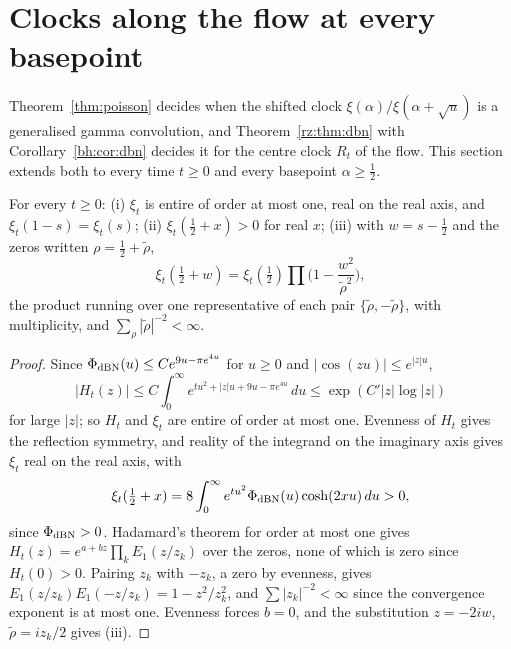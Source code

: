 \section{Clocks along the flow at every basepoint}\label{cp:sec:transfer}

Theorem~\ref{thm:poisson} decides when the shifted clock $\xi(\alpha)/\xi(\alpha+\sqrt u)$ is a generalised gamma convolution, and Theorem~\ref{rz:thm:dbn} with Corollary~\ref{bh:cor:dbn} decides it for the centre clock $R_t$ of the flow. This section extends both to every time $t\ge0$ and every basepoint $\alpha\ge\frac12$.

\begin{lemma}[Structure of $\xi_t$]\label{cp:lem:structure}
For every $t\ge0$: (i) $\xi_t$ is entire of order at most one, real on the real axis, and $\xi_t(1-s)=\xi_t(s)$; (ii) $\xi_t(\frac12+x)>0$ for real $x$; (iii) with $w=s-\frac12$ and the zeros written $\rho=\frac12+\tilde\rho$,
\[
\xi_t(\tfrac12+w)=\xi_t(\tfrac12)\prod\Big(1-\frac{w^2}{\tilde\rho^2}\Big),
\]
the product running over one representative of each pair $\{\tilde\rho,-\tilde\rho\}$, with multiplicity, and $\sum_\rho|\tilde\rho|^{-2}<\infty$.
\end{lemma}

\begin{proof}
Since $\Phi_{\rm dBN}(u)\le Ce^{9u-\pi e^{4u}}$ for $u\ge0$ and $|\cos(zu)|\le e^{|z|u}$,
\[
|H_t(z)|\le C\int_0^\infty e^{tu^2+|z|u+9u-\pi e^{4u}}\,du\le\exp(C'|z|\log|z|)
\]
for large $|z|$; so $H_t$ and $\xi_t$ are entire of order at most one. Evenness of $H_t$ gives the reflection symmetry, and reality of the integrand on the imaginary axis gives $\xi_t$ real on the real axis, with
\[
\xi_t(\tfrac12+x)=8\int_0^\infty e^{tu^2}\Phi_{\rm dBN}(u)\cosh(2xu)\,du>0,
\]
since $\Phi_{\rm dBN}>0$. Hadamard's theorem for order at most one gives $H_t(z)=e^{a+bz}\prod_kE_1(z/z_k)$ over the zeros, none of which is zero since $H_t(0)>0$. Pairing $z_k$ with $-z_k$, a zero by evenness, gives $E_1(z/z_k)E_1(-z/z_k)=1-z^2/z_k^2$, and $\sum|z_k|^{-2}<\infty$ since the convergence exponent is at most one. Evenness forces $b=0$, and the substitution $z=-2iw$, $\tilde\rho=iz_k/2$ gives (iii).
\end{proof}

